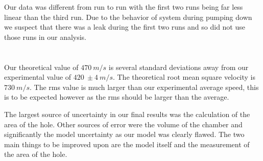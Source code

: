 \documentclass[12pt,a4paper]{article}
\begin{document}
Our data was different from run to run with the first two runs being far less linear than the third run. Due to the behavior of system during pumping down we suspect that there was a leak during the first two runs and so did not use those runs in our analysis.
\section{}
Our theoretical value of $470\ m/s$ is several standard deviations away from our experimental value of $420\ \pm 4\ m/s$. The theoretical root mean square velocity is $730\ m/s$. The rms value is much larger than our experimental average speed, this is to be expected however as the rms should be larger than the average.


The largest source of uncertainty in our final results was the calculation of the area of the hole. Other sources of error were the volume of the chamber and significantly the model uncertainty as our model was clearly flawed. The two main things to be improved upon are the model itself and the measurement of the area of the hole. 
\end{document}
